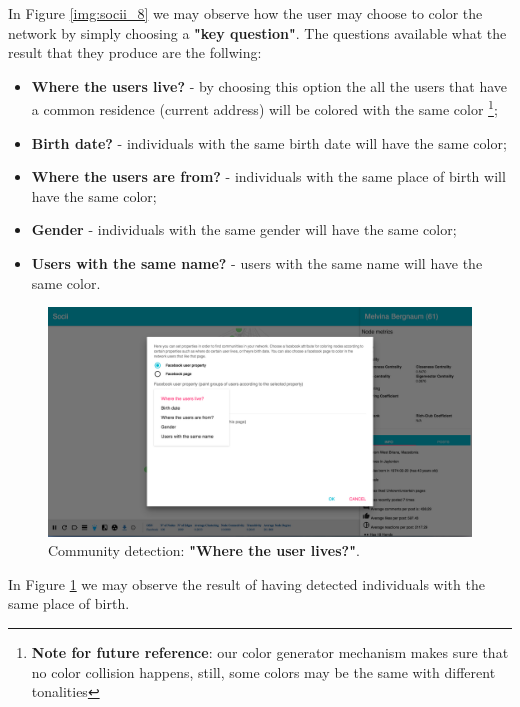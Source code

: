 In Figure \ref{img:socii_8} we may observe how the user may choose to color the network by simply choosing a \textbf{"key question"}. The questions available what the result that they produce are the follwing:

\begin{itemize}
    \item \textbf{Where the users live?} - by choosing this option the all the users that have a common residence (current address) will be colored with the same color \footnote{\textbf{Note for future reference}: our color generator mechanism makes sure that no color collision happens, still, some colors may be the same with different tonalities};
    \item \textbf{Birth date?} - individuals with the same birth date will have the same color;
    \item \textbf{Where the users are from?} - individuals with the same place of birth will have the same color;
    \item \textbf{Gender} - individuals with the same gender will have the same color;
    \item \textbf{Users with the same name?} - users with the same name will have the same color.
\end{itemize}

\begin{figure}[h!]
\begin{center}
  \hspace*{-0.8in}
  \includegraphics[width=1.2\textwidth]{img/socii/socii_8.png}
\end{center}
\caption{\label{img:socii_9} Community detection: \textbf{"Where the user lives?"}.}
\end{figure}

In Figure \ref{img:socii_9} we may observe the result of having detected individuals with the same place of birth.

